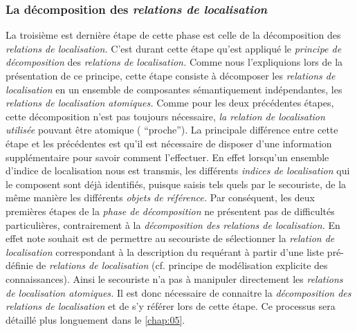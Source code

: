 \subsubsection{La décomposition des \emph{relations de localisation}}

La troisième est dernière étape de cette phase est celle de la
décomposition des \emph{relations de localisation.} C'est durant cette
étape qu'est appliqué le \emph{principe de décomposition} des
\emph{relations de localisation.} Comme nous l'expliquions lors de la
présentation de ce principe, cette étape consiste à décomposer les
\emph{relations de localisation} en un ensemble de composantes
sémantiquement indépendantes, les \emph{relations de localisation
  atomiques.} Comme pour les deux précédentes étapes, cette
décomposition n'est pas toujours nécessaire, \emph{la relation de
  localisation utilisée} pouvant être atomique (\eg
\enquote{proche}). La principale différence entre cette étape et les
précédentes est qu'il est nécessaire de disposer d'une information
supplémentaire pour savoir comment l'effectuer. En effet lorsqu'un
ensemble d'indice de localisation nous est transmis, les différents
\emph{indices de localisation} qui le composent sont déjà identifiés,
puisque saisis tels quels par le secouriste, de la même manière les
différents \emph{objets de référence.} Par conséquent, les deux
premières étapes de la \emph{phase de décomposition} ne présentent pas
de difficultés particulières, contrairement à la \emph{décomposition
  des relations de localisation.} En effet note souhait est de
permettre au secouriste de sélectionner la \emph{relation de
  localisation} correspondant à la description du requérant à partir
d'une liste pré-définie de \emph{relations de localisation}
(cf. principe de modélisation explicite des connaissances). Ainsi le
secouriste n'a pas à manipuler directement les \emph{relations de
  localisation atomiques.} Il est donc nécessaire de connaitre la
\emph{décomposition des relations de localisation} et de s'y référer
lors de cette étape. Ce processus sera détaillé plus longuement dans
le \autoref{chap:05}.


